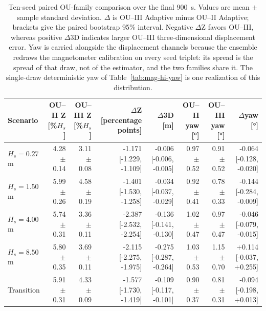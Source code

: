 
\begin{table}[t]
  \centering
  \caption{Ten-seed paired OU-family comparison over the final \SI{900}{s}. Values are mean $\pm$ sample standard deviation. $\Delta$ is OU--III Adaptive minus OU--II Adaptive; brackets give the paired bootstrap 95\% interval. Negative $\Delta$Z favors OU--III, whereas positive $\Delta$3D indicates larger OU--III three-dimensional displacement error. Yaw is carried alongside the displacement channels because the ensemble redraws the magnetometer calibration on every seed triplet: its spread is the spread of that draw, not of the estimator, and the two families share it. The single-draw deterministic yaw of Table~\ref{tab:mag-hi-yaw} is one realization of this distribution.}
  \label{tab:ou_mc_family}
  \footnotesize
  \setlength{\tabcolsep}{4.0pt}
  \begin{tabular}{@{}lrrrrrrr@{}}
    \toprule
    Scenario & OU--II Z [\%$H_s$] & OU--III Z [\%$H_s$] & $\Delta$Z [percentage points] & $\Delta$3D [m] & OU--II yaw [\si{\degree}] & OU--III yaw [\si{\degree}] & $\Delta$yaw [\si{\degree}] \\
    \midrule
    $H_s=0.27$ m & 4.28 $\pm$ 0.14 & 3.11 $\pm$ 0.08 & -1.171 [-1.229, -1.109] & -0.006 [-0.006, -0.005] & 0.97 $\pm$ 0.52 & 0.91 $\pm$ 0.52 & -0.064 [-0.128, -0.020] \\
    $H_s=1.50$ m & 5.99 $\pm$ 0.26 & 4.58 $\pm$ 0.19 & -1.401 [-1.530, -1.258] & -0.034 [-0.037, -0.029] & 0.92 $\pm$ 0.41 & 0.78 $\pm$ 0.33 & -0.144 [-0.284, -0.009] \\
    $H_s=4.00$ m & 5.74 $\pm$ 0.31 & 3.36 $\pm$ 0.11 & -2.387 [-2.532, -2.254] & -0.136 [-0.141, -0.130] & 1.02 $\pm$ 0.47 & 0.97 $\pm$ 0.47 & -0.046 [-0.079, -0.015] \\
    $H_s=8.50$ m & 5.80 $\pm$ 0.35 & 3.69 $\pm$ 0.11 & -2.115 [-2.275, -1.975] & -0.275 [-0.287, -0.264] & 1.03 $\pm$ 0.53 & 1.15 $\pm$ 0.70 & +0.114 [-0.037, +0.255] \\
    Transition & 5.91 $\pm$ 0.31 & 4.33 $\pm$ 0.09 & -1.577 [-1.730, -1.419] & -0.109 [-0.117, -0.101] & 0.90 $\pm$ 0.37 & 0.81 $\pm$ 0.31 & -0.094 [-0.198, +0.013] \\
    \bottomrule
  \end{tabular}
\end{table}

